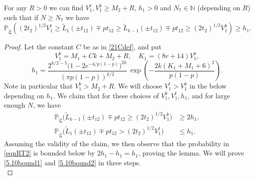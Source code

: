 \begin{lemma}\label{LemmaBP2} For any $R > 0$ we can find $V_1^t, V_1^b \geq M_2 + R$, $h_1 > 0$ and $N_7 \in \mathbb{N}$ (depending on $R$) such that if $N \geq N_7$ we have
	\begin{equation}\label{eqnRT2}
	\mathbb{P}_{\tilde{\mathfrak{L}}} \left(  (2t_2)^{1/2} V_1^t \geq \tilde{L}_1(\pm t_{12}) \mp p t_{12} \geq \tilde{L}_{k-1}(\pm t_{12}) \mp p t_{12} \geq (2t_2)^{1/2} V_1^b  \right) \geq h_1.
	\end{equation}
	
\end{lemma}

\begin{proof}
	
	Let the constant $C$ be as in \eqref{21Cdef}, and put
	\begin{equation}\label{5.10Vb}
	V_1^b = M_1 + Ck + M_2 + R, \quad K_1 = (8r+14)V_1^b,
	\end{equation}
	\begin{equation}\label{5.10h1}
	h_1 =  \frac{2^{k/2-5}\big(1-2e^{-4/p(1-p)}\big)^{2k}}{(\pi p(1-p))^{k/2}}\,\exp\left(-\frac{2k(K_1+M_1+6)^2}{p(1-p)}\right).
	\end{equation}
	Note in particular that $V_1^b > M_2 + R$. We will choose $V_1^t > V_1^b$ in the below depending on $h_1$. We claim that for these choices of  $V_1^b, V_1^t, h_1$, and for large enough $N$, we have 
	\begin{align}
	\mathbb{P}_{\tilde{\mathfrak{L}}}\Big(\tilde{L}_{k-1}(\pm t_{12}) \mp pt_{12} \geq (2t_2)^{1/2}V_1^b\Big) &\geq 2h_1, \label{5.10bound1}\\
	\mathbb{P}_{\tilde{\mathfrak{L}}}\Big(\tilde{L}_1(\pm t_{12}) \mp pt_{12} > (2t_2)^{1/2}V_1^t\Big) &\leq h_1. \label{5.10bound2}
	\end{align}
	Assuming the validity of the claim, we then observe that the probability in \eqref{eqnRT2} is bounded below by $2h_1 - h_1 = h_1$, proving the lemma. We will prove \eqref{5.10bound1} and \eqref{5.10bound2} in three steps.\\
	

\end{proof}
